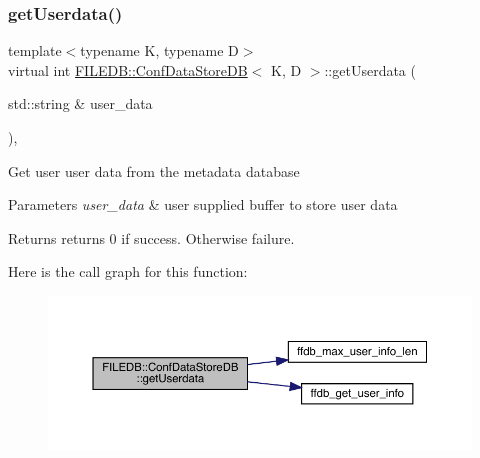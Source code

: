 \subsubsection{\texorpdfstring{getUserdata()}{getUserdata()}\hspace{0.1cm}{\footnotesize\ttfamily [2/2]}}
{\footnotesize\ttfamily template$<$typename K, typename D$>$ \\
virtual int \mbox{\hyperlink{classFILEDB_1_1ConfDataStoreDB}{F\+I\+L\+E\+D\+B\+::\+Conf\+Data\+Store\+DB}}$<$ K, D $>$\+::get\+Userdata (\begin{DoxyParamCaption}\item[{std\+::string \&}]{user\+\_\+data }\end{DoxyParamCaption})\hspace{0.3cm}{\ttfamily [inline]}, {\ttfamily [virtual]}}

Get user user data from the metadata database


\begin{DoxyParams}{Parameters}
{\em user\+\_\+data} & user supplied buffer to store user data \\
\hline
\end{DoxyParams}
\begin{DoxyReturn}{Returns}
returns 0 if success. Otherwise failure. 
\end{DoxyReturn}
Here is the call graph for this function\+:
\nopagebreak
\begin{figure}[H]
\begin{center}
\leavevmode
\includegraphics[width=350pt]{d8/d19/classFILEDB_1_1ConfDataStoreDB_abf7ce0847e1d68f960836826d68c0079_cgraph}
\end{center}
\end{figure}
\mbox{\label{classFILEDB_1_1ConfDataStoreDB_a9917cff27ec340f88e59ddb9be630ecf}} 
